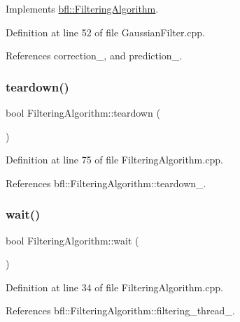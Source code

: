 Implements \mbox{\hyperlink{classbfl_1_1FilteringAlgorithm_ac8a718a614905d89d6a43bbbc70d68b2}{bfl\+::\+Filtering\+Algorithm}}.



Definition at line 52 of file Gaussian\+Filter.\+cpp.



References correction\+\_\+, and prediction\+\_\+.

\mbox{\label{classbfl_1_1FilteringAlgorithm_a1dc912d89ee8f96d4f3e8209865c5308}} 
\subsubsection{\texorpdfstring{teardown()}{teardown()}}
{\footnotesize\ttfamily bool Filtering\+Algorithm\+::teardown (\begin{DoxyParamCaption}{ }\end{DoxyParamCaption})\hspace{0.3cm}{\ttfamily [inherited]}}



Definition at line 75 of file Filtering\+Algorithm.\+cpp.



References bfl\+::\+Filtering\+Algorithm\+::teardown\+\_\+.

\mbox{\label{classbfl_1_1FilteringAlgorithm_a40372c24fa050eb0274371172df0a244}} 
\subsubsection{\texorpdfstring{wait()}{wait()}}
{\footnotesize\ttfamily bool Filtering\+Algorithm\+::wait (\begin{DoxyParamCaption}{ }\end{DoxyParamCaption})\hspace{0.3cm}{\ttfamily [inherited]}}



Definition at line 34 of file Filtering\+Algorithm.\+cpp.



References bfl\+::\+Filtering\+Algorithm\+::filtering\+\_\+thread\+\_\+.



